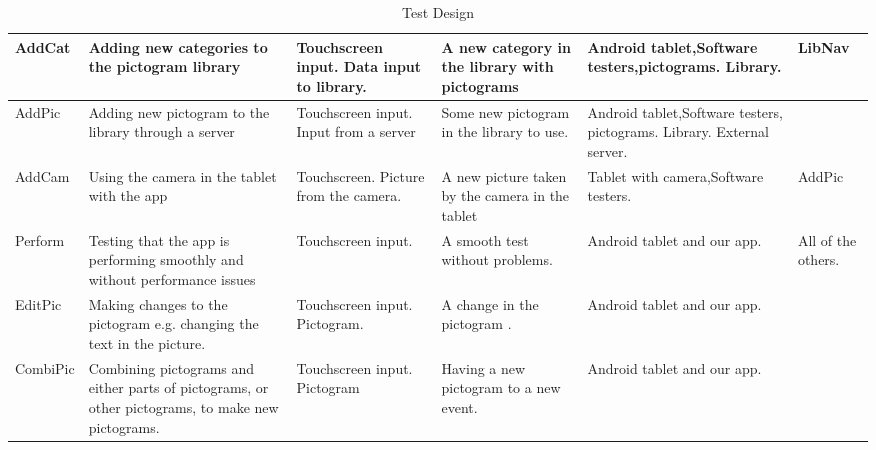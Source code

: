 \begin{sidewaystable}
{\begin{tabular}{|p{2cm}|p{5cm}|p{5cm}|p{5cm}|p{5cm}|p{3cm}|}
        AddCat      & Adding new categories to the pictogram library                                                  & Touchscreen input. Data input to library.            & A new category in the library with pictograms                                     & Android tablet,\newline Software testers,\newline  pictograms.  Library.            & LibNav                              \\ \hline
        AddPic      & Adding new pictogram to the library   through a server                                             & Touchscreen input. Input from a server               & Some new pictogram in the library to use.                                         & Android tablet,\newline Software testers, \newline pictograms. \newline Library. External server. & ~                                   \\ \hline
        AddCam      & Using the camera in the tablet with the app                                                       & Touchscreen.  \newline Picture from the camera.            & A new picture taken by the camera in the tablet                                   & Tablet with camera,\newline Software testers.                                   & AddPic                              \\ \hline
        Perform     & Testing that the app is performing smoothly and without performance issues                         & Touchscreen input.                                   & A smooth test without problems.                                                    & Android tablet and our app.                                             & All of the others.                  \\ \hline
        EditPic     & Making changes to the pictogram e.g. changing the text in the picture.                            & Touchscreen input.  \newline Pictogram.                    & A change in the pictogram .                                                       & Android tablet and our app.                                             & ~                                   \\ \hline
        CombiPic    & Combining pictograms and either parts of pictograms, or other pictograms, to make new pictograms. & Touchscreen \newline  input.  \newline Pictogram                 & Having a new pictogram to a new event.                                            & Android tablet and our app.                                             & ~                                   \\
        \hline
    \end{tabular}}
    \caption{Test Design}
\end{sidewaystable}

